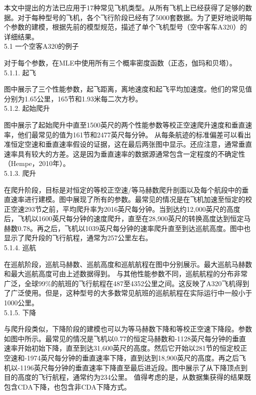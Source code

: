 \documentclass[a4paper,punct,space,heading=true,AutoFakeBold]{ctexrep}
\begin{document}
本文中提出的方法已应用于17种常见飞机类型。从所有飞机上已经获得了足够的数据。对于每种型号的飞机，各个飞行阶段已经有了5000套数据。为了更好地说明每个参数的建模，根据先前的模型规范，描述了单个飞机型号（空中客车A320）的详细结果。\\
5.1 一个空客A320的例子

对于每个参数，在MLE中使用所有三个概率密度函数（正态，伽玛和贝塔）。\\
5.1.1. 起飞

图中展示了三个性能参数，起飞距离，离地速度和起飞平均加速度。他们的常见值分别为1.65公里，165节和1.93米每二次方秒。\\
5.1.2. 起始爬升

图中展示了起始爬升中直至1500英尺的两个性能参数等校正空速爬升速度和垂直速率，他们最常见的值为161节和2477英尺每分钟。
从每条航迹的标准偏差可以看出准恒定空速和垂直速率假设的证据，这在最后两张图中显示。还应注意，通常垂直速率具有较大的方差。这是因为垂直速率的数据源通常包含一定程度的不确定性（Hempe，2010年）。\\
5.1.3. 爬升

在爬升阶段，目标是对恒定的等校正空速/等马赫数爬升剖面以及每个航段中的垂直速率进行建模。图中展现了所有的参数。最常见的情况是在飞机加速至恒定的校正空速293节之前，平均爬升率为2016英尺每分钟。当到达约12,000英尺的高度后，飞机以1600英尺每分钟的速度爬升，直至在28,900英尺的转换高度达到恒定马赫数0.78。再之后，飞机以1039英尺每分钟的速率爬升直至到达巡航高度。图中也显示了爬升段的飞行航程，通常为257公里左右。\\
5.1.4. 巡航

在巡航阶段，巡航马赫数、巡航高度和巡航航程在图中分别展示。最大巡航马赫数和最大巡航高度可由上述数据得到。
与其他性能参数不同，巡航航程的分布非常广泛，全球99\%的航班的飞行航程在487至4352公里之间。这反映了A320飞机得到了广泛使用。但是，这种型号的大多数常见航班的巡航航程在实际运行中一般小于1000公里。\\
5.1.5. 下降

与爬升段类似，下降阶段的建模也可以为等马赫数下降和等校正空速下降段。参数如图中所示。最常见的情况是飞机以0.77的恒定马赫数和-1128英尺每分钟的垂直速率开始初始下降，直至到达31,600英尺的高度。然后它开始以281节的恒定校正空速和-1974英尺每分钟的垂直速率下降，直到达到18,900英尺的高度。再之后飞机以-1196英尺每分钟的垂直速率下降直至最后进近段。图中展示了从下降顶点到目的高度的飞行航程，通常约为234公里。
值得考虑的是，从数据集获得的结果既包含CDA下降，也包含非CDA下降方式。


	

\end{document}
